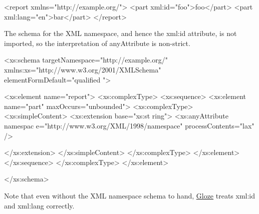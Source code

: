\begin{DoxyCodeInclude}
<report xmlns="http://example.org/">
  <part xml:id="foo">foo</part>
  <part xml:lang="en">bar</part>
</report>
\end{DoxyCodeInclude}


The schema for the XML namespace, and hence the xml:id attribute, is not imported, so the interpretation of anyAttribute is non-\/strict.


\begin{DoxyCodeInclude}
<xs:schema targetNamespace="http://example.org/"
        xmlns:xs="http://www.w3.org/2001/XMLSchema" elementFormDefault="qualified
      ">

        <xs:element name="report">
                <xs:complexType>
                        <xs:sequence>
                                <xs:element name="part" maxOccurs="unbounded">
                                        <xs:complexType>
                                                <xs:simpleContent>
                                                        <xs:extension base="xs:st
      ring">
                                                        <xs:anyAttribute namespac
      e="http://www.w3.org/XML/1998/namespace" 
                                                         processContents="lax" />
                                                                      
                                                        </xs:extension>
                                                </xs:simpleContent>
                                        </xs:complexType>
                                </xs:element>
                        </xs:sequence>
                </xs:complexType>
        </xs:element>

</xs:schema>

\end{DoxyCodeInclude}


Note that even without the XML namespace schema to hand, \hyperlink{classcom_1_1hp_1_1gloze_1_1_gloze}{Gloze} treats xml:id and xml:lang correctly.


